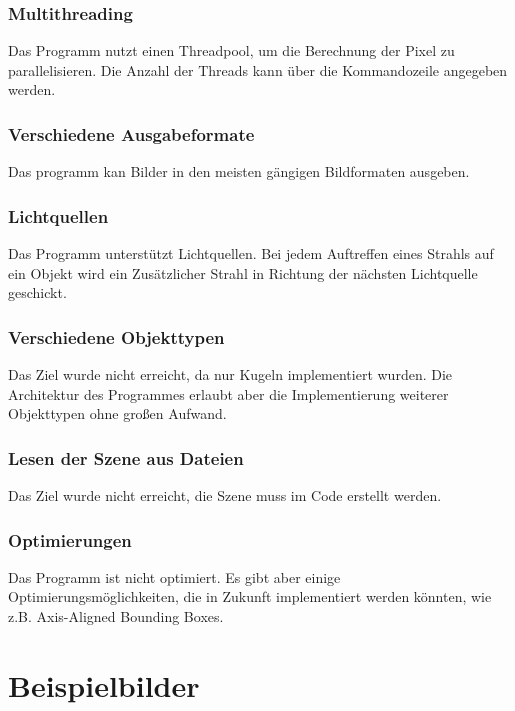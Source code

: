 \documentclass[a4paper, 10pt]{article}
\begin{document}
\subsubsection*{Multithreading}

Das Programm nutzt einen Threadpool, um die Berechnung der Pixel zu parallelisieren.
Die Anzahl der Threads kann über die Kommandozeile angegeben werden.

\subsubsection*{Verschiedene Ausgabeformate}

Das programm kan Bilder in den meisten gängigen Bildformaten ausgeben.

\subsubsection*{Lichtquellen}

Das Programm unterstützt Lichtquellen.
Bei jedem Auftreffen eines Strahls auf ein Objekt wird ein Zusätzlicher Strahl in Richtung der nächsten Lichtquelle geschickt.

\subsubsection*{Verschiedene Objekttypen}

Das Ziel wurde nicht erreicht, da nur Kugeln implementiert wurden.
Die Architektur des Programmes erlaubt aber die Implementierung weiterer Objekttypen ohne großen Aufwand.

\subsubsection*{Lesen der Szene aus Dateien}

Das Ziel wurde nicht erreicht, die Szene muss im Code erstellt werden.

\subsubsection*{Optimierungen}

Das Programm ist nicht optimiert.
Es gibt aber einige Optimierungsmöglichkeiten, die in Zukunft implementiert werden könnten, wie z.B.
Axis-Aligned Bounding Boxes.

\section{Beispielbilder}
\end{document}
